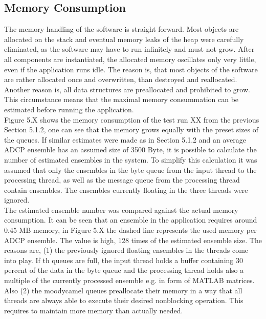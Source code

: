 \subsection{Memory Consumption}
The memory handling of the software is straight forward. Most objects are allocated on the stack and eventual memory leaks of the heap were carefully eliminated, as the software may have to run infinitely and must not grow. After all components are instantiated, the allocated memory oscillates only very little, even if the application runs idle. The reason is, that most objects of the software are rather allocated once and overwritten, than destroyed and reallocated. Another reason is, all data structures are preallocated and prohibited to grow. This circumstance means that the maximal memory consummation can be estimated before running the application.\\
Figure 5.X shows the memory consumption of the test run XX from the previous Section 5.1.2, one can see that the memory grows equally with the preset sizes of the queues. If similar estimates were made as in Section 5.1.2 and an average ADCP ensemble has an assumed size of 3500 Byte, it is possible to calculate the number of estimated ensembles in the system. To simplify this calculation it was assumed that only the ensembles in the byte queue from the input thread to the processing thread, as well as the message queue from the processing thread contain ensembles. The ensembles currently floating in the three threads were ignored.\\
The estimated ensemble number was compared against the actual memory consumption. It can be seen that an ensemble in the application requires around 0.45 MB memory, in Figure 5.X the dashed line represents the used memory per ADCP ensemble. The value is high, 128 times of the estimated ensemble size. The reasons are, (1) the previously ignored floating ensembles in the threads come into play. If th queues are full, the input thread holds a buffer containing 30 percent of the data in the byte queue and the processing thread holds also a multiple of the currently processed ensemble e.g. in form of MATLAB matrices. Also (2) the moodycamel queues preallocate their memory in a way that all threads are always able to execute their desired nonblocking operation. This requires to maintain more memory than actually needed. 


